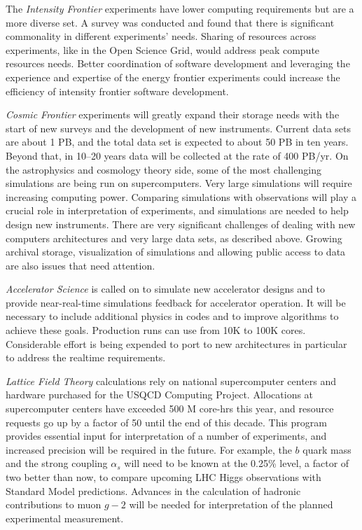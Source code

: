 The {\it Intensity Frontier} experiments have lower computing requirements but are a more diverse set. A survey was conducted and found that there is significant commonality in different experiments' needs. Sharing of resources across experiments, like in the Open Science Grid, would address peak compute resources needs. Better coordination of software development and leveraging the experience and expertise of the energy frontier experiments could increase the efficiency of intensity frontier software development.

{\it Cosmic Frontier} experiments will greatly expand their storage needs with the start of new surveys and the development of new instruments.  Current data sets are about 1 PB, and the total data set is expected to about 50 PB in ten years. Beyond that, in 10--20 years data will be collected at the rate of 400 PB/yr. On the astrophysics and cosmology theory side, some of the most challenging simulations are being run on supercomputers. Very large simulations will require increasing computing power. Comparing simulations with observations will play a crucial role in interpretation of experiments, and simulations are needed to help design new instruments. There are very significant challenges of dealing with new computers architectures and very large data sets, as described above.  Growing archival storage, visualization of simulations and allowing public access to data are also issues that need attention.

{\it Accelerator Science} is called on to simulate new accelerator designs and to provide near-real-time simulations feedback for accelerator operation. It will be necessary to include additional physics in codes and to improve algorithms to achieve these goals. Production runs can use from 10K to 100K cores.  Considerable effort is being expended to port to new architectures in particular to address the realtime requirements.

{\it Lattice Field Theory} calculations rely on national supercomputer centers and hardware purchased for the USQCD Computing Project. Allocations at supercomputer centers have exceeded 500 M core-hrs this year, and resource requests go up by a factor of 50 until the end of this decade. This program provides essential input for interpretation of a number of experiments, and increased precision will be required in the future.  For example, the $b$ quark mass and the strong coupling $\alpha_s$ will need to be known at the 0.25\% level, a factor of two better than now, to compare upcoming LHC Higgs observations with Standard Model predictions.  Advances in the calculation of hadronic contributions to muon $g-2$ will be needed for interpretation of the planned experimental measurement.

